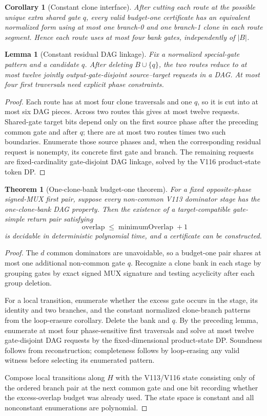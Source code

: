 \documentclass[11pt]{article}
\newtheorem{theorem}{Theorem}
\newtheorem{lemma}{Lemma}
\newtheorem{corollary}{Corollary}
\begin{document}
\begin{corollary}[Constant clone interface]
After cutting each route at the possible unique extra shared gate $q$, every valid budget-one certificate has an equivalent normalized form using at most one branch-0 and one branch-1 clone in each route segment. Hence each route uses at most four bank gates, independently of $|B|$.
\end{corollary}

\begin{lemma}[Constant residual DAG linkage]
Fix a normalized special-gate pattern and a candidate $q$. After deleting $B\cup\{q\}$, the two routes reduce to at most twelve jointly output-gate-disjoint source--target requests in a DAG. At most four first traversals need explicit phase constraints.
\end{lemma}
\begin{proof}
Each route has at most four clone traversals and one $q$, so it is cut into at most six DAG pieces. Across two routes this gives at most twelve requests. Shared-gate target bits depend only on the first source phase after the preceding common gate and after $q$; there are at most two routes times two such boundaries. Enumerate those source phases and, when the corresponding residual request is nonempty, its concrete first gate and branch. The remaining requests are fixed-cardinality gate-disjoint DAG linkage, solved by the V116 product-state token DP.
\end{proof}

\begin{theorem}[One-clone-bank budget-one theorem]
For a fixed opposite-phase signed-MUX first pair, suppose every non-common V113 dominator stage has the one-clone-bank DAG property. Then the existence of a target-compatible gate-simple return pair satisfying
\[
\operatorname{overlap}\leq \operatorname{minimumOverlap}+1
\]
is decidable in deterministic polynomial time, and a certificate can be constructed.
\end{theorem}
\begin{proof}
The $d$ common dominators are unavoidable, so a budget-one pair shares at most one additional non-common gate $q$. Recognize a clone bank in each stage by grouping gates by exact signed MUX signature and testing acyclicity after each group deletion.

For a local transition, enumerate whether the excess gate occurs in the stage, its identity and two branches, and the constant normalized clone-branch patterns from the loop-erasure corollary. Delete the bank and $q$. By the preceding lemma, enumerate at most four phase-sensitive first traversals and solve at most twelve gate-disjoint DAG requests by the fixed-dimensional product-state DP. Soundness follows from reconstruction; completeness follows by loop-erasing any valid witness before selecting its enumerated pattern.

Compose local transitions along $H$ with the V113/V116 state consisting only of the ordered branch pair at the next common gate and one bit recording whether the excess-overlap budget was already used. The state space is constant and all nonconstant enumerations are polynomial.
\end{proof}
\end{document}
